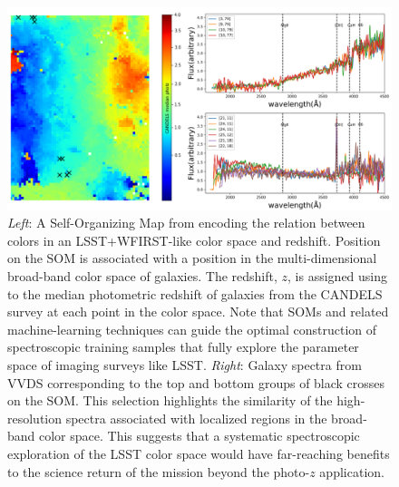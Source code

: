 \documentclass[oneside,11pt]{amsart}
\begin{document}

\begin{figure}[h!]
%
\vskip -0.2in
%
\includegraphics[width=\textwidth]{Hemmati18_Fig8_VVDS_spec.png}
%
\caption{\small {\it Left}: A Self-Organizing Map
\citep[SOM;][]{1990Natur.346...24K} from \citet{hemmati18} encoding the
relation between colors in an LSST+WFIRST-like color space and redshift.
Position on the SOM is associated with a position in the
multi-dimensional broad-band color space of galaxies.  The redshift,
$z$, is assigned using to the median photometric redshift of galaxies
from the CANDELS survey \citep{2011ApJS..197...35G} at each point in the
color space.  Note that SOMs and related machine-learning techniques can
guide the optimal construction of spectroscopic training samples that
fully explore the parameter space of imaging surveys like LSST.  {\it
Right}: Galaxy spectra from VVDS \citep{2005A&A...439..845L}
corresponding to the top and bottom groups of black crosses on the SOM.
This selection highlights the similarity of the high-resolution spectra
associated with localized regions in the broad-band color space. This
suggests that a systematic spectroscopic exploration of the LSST color
space would have far-reaching benefits to the science return of the
mission beyond the photo-$z$ application.}
%
\label{fig:SOM}
%
\end{figure}
\end{document}
